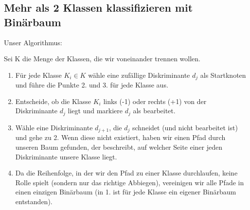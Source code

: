 \documentclass[12pt]{article}
\begin{document}
\newpage

\subsection{Mehr als 2 Klassen klassifizieren mit Bin\"arbaum}

Unser Algorithmus:

Sei K die Menge der Klassen, die wir voneinander trennen wollen.

\begin{enumerate}
\item Für jede Klasse $K_i \in K$ wähle eine zufällige Diskriminante $d_j$ als Startknoten und führe die Punkte 2. und 3. für jede Klasse aus.
\item Entscheide, ob die Klasse $K_i$ links (-1) oder rechts (+1) von der Diskriminante $d_j$ liegt und markiere $d_j$ als bearbeitet.
\item Wähle eine Diskriminante $d_{j+1}$, die $d_j$ schneidet (und nicht bearbeitet ist) und gehe zu 2. Wenn diese nicht existiert, haben wir einen Pfad durch unseren Baum gefunden, der beschreibt, auf welcher Seite einer jeden Diskriminante unsere Klasse liegt.
\item Da die Reihenfolge, in der wir den Pfad zu einer Klasse durchlaufen, keine Rolle spielt (sondern nur das richtige Abbiegen), vereinigen wir alle Pfade in einen einzigen Binärbaum (in 1. ist für jede Klasse ein eigener Binärbaum entstanden).
\end{enumerate}
\end{document}
